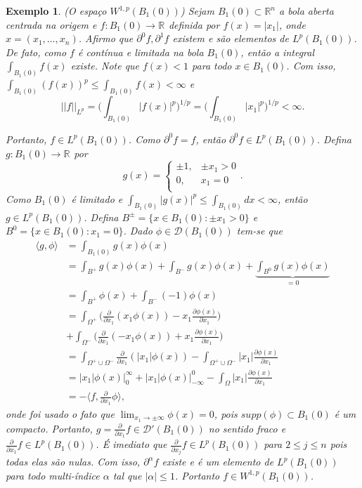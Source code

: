 \documentclass[12pt]{book}
\newtheorem{exemplo}[teorema]{Exemplo}
\newcommand{\bigparenteses}[1]{\Big( #1 \Big) }
\newcommand{\derivadaparcial}[2]{\frac{\partial #1}{\partial #2}}
\newcommand{\distribuicoesgeral}[1]{\mathcal{D'}(#1)}
\newcommand{\espacoLp}[1]{L^{p}(#1)}
\newcommand{\espacosobolev}[1]{W^{1,p}(#1)}
\newcommand{\espacosobolevgeral}[2]{W^{1,#1}(#2)}
\newcommand{\funcaocond}[5]{
	#1 = 
	\left\{
	\begin{array}{cc}
		#2, & #3\\
		#4, & #5\\
	\end{array}
	\right.
}
\newcommand{\funcoestestegeral}[1]{\mathcal{D}(#1)}
\newcommand{\normaLp}[1]{||#1||_{L^{p}}}
\newcommand{\normaLpdefinicao}[2]{ \Big(\int_{#2}#1^{p}\Big)^{1/p}}
\newcommand{\produtointerno}[2]{\langle #1, #2 \rangle}
\newcommand{\real}[1]{\mathbb{R}^{#1}}
\newcommand{\reta}{\real{}}
\begin{document}
	\begin{exemplo}
		(O espaço $\espacosobolevgeral{p}{B_{1}(0)}$) Sejam $B_{1}(0)\subset \real{n}$ a bola aberta centrada na origem e $f:B_{1}(0) \to \reta$ definida por $f(x) = |x_{1}|$, onde $x = (x_{1}, \dots, x_{n})$. Afirmo que $\partial^{0}f, \partial^{1}f $ existem e são elementos de $\espacoLp{B_{1}(0)}$. De fato, como $f$ é contínua e limitada na bola $B_{1}(0)$, então a integral $\int_{B_{1}(0)}f(x)$ existe. Note que $f(x)<1$ para todo $x\in B_{1}(0)$. Com isso, $\int_{B_{1}(0)}(f(x))^{p}\leq \int_{B_{1}(0)}f(x)<\infty$ e 
		$$
		\normaLp{f}=\normaLpdefinicao{|f(x)|}{B_{1}(0)}=\normaLpdefinicao{|x_{1}|}{B_{1}(0)}<\infty.
		$$
		
		Portanto, $f \in \espacoLp{B_{1}(0)}$. Como $\partial^{0}f = f$, então $\partial^{0}f\in \espacoLp{B_{1}(0)}$. Defina $g:B_{1}(0)\to \reta$ por
		$$
		\funcaocond{g(x)}{\pm 1}{\pm x_{1}>0}{0}{x_{1} = 0}.
		$$
		Como $B_{1}(0)$ é limitado e $\int_{B_{1}(0)}|g(x)|^{p}\leq \int_{B_{1}(0)}dx<\infty$, então $g\in \espacoLp{B_{1}(0)}$. Defina $B^{\pm} = \{x \in B_{1}(0): \pm x_{1} >0\}$ e $B^{0}= \{x \in B_{1}(0):  x_{1} =0\}$. Dado $\phi \in \funcoestestegeral{B_{1}(0)}$ tem-se que
		$$
		\begin{aligned}
		\produtointerno{g}{\phi} 
		&= \int_{B_{1}(0)}g(x)\phi(x)
		\\
		&=\int_{B^{+}}g(x)\phi(x)+\int_{B^{-}}g(x)\phi(x)+\underbrace{\int_{B^{0}}g(x)\phi(x)}_{=0}
		\\
		&=\int_{B^{+}}\phi(x)+\int_{B^{-}}(-1)\phi(x)
		\\ &=\int_{\Omega^{+}}\bigparenteses{\derivadaparcial{}{x_{1}}(x_{1}\phi(x)) - x_{1}\derivadaparcial{\phi(x)}{x_{1}}} 
		\\
		&+\int_{\Omega^{-}}\bigparenteses{\derivadaparcial{}{x_{1}}(-x_{1}\phi(x)) + x_{1}\derivadaparcial{\phi(x)}{x_{1}}}
		\\ 
		&=
		\int_{\Omega^{+}\cup \Omega^{-}}\derivadaparcial{}{x_{1}}(|x_{1}|\phi(x)) - \int_{\Omega^{+}\cup \Omega^{-}}|x_{1}|\derivadaparcial{\phi(x)}{x_{1}}
		\\
		&=
		|x_{1}|\phi(x)\Big|_{0}^{\infty}+|x_{1}|\phi(x)\Big|_{-\infty}^{0}- \int_{\Omega}|x_{1}|\derivadaparcial{\phi(x)}{x_{1}}
		\\
		&=
		-\produtointerno{f}{\derivadaparcial{}{x_{1}}\phi},
		\end{aligned}
		$$
		onde foi usado o fato que $\lim_{x_{1}\to \pm \infty}\phi(x) = 0$, pois $supp(\phi) \subset B_{1}(0)$ é um compacto. Portanto, $g = \derivadaparcial{}{x_{1}}f \in \distribuicoesgeral{B_{1}(0)}$ no sentido fraco e $\derivadaparcial{}{x_{1}}f \in \espacoLp{B_{1}(0)}$. É imediato que $\derivadaparcial{}{x_{j}}f\in \espacoLp{B_{1}(0)}$ para $2\leq j \leq n$ pois todas elas são nulas. Com isso, $\partial^{\alpha}f$ existe e é um elemento de $\espacoLp{B_{1}(0)}$ para todo multi-índice $\alpha$ tal que $|\alpha|\leq 1$. Portanto $f\in \espacosobolev{B_{1}(0)}$.
	\end{exemplo}
\end{document}
